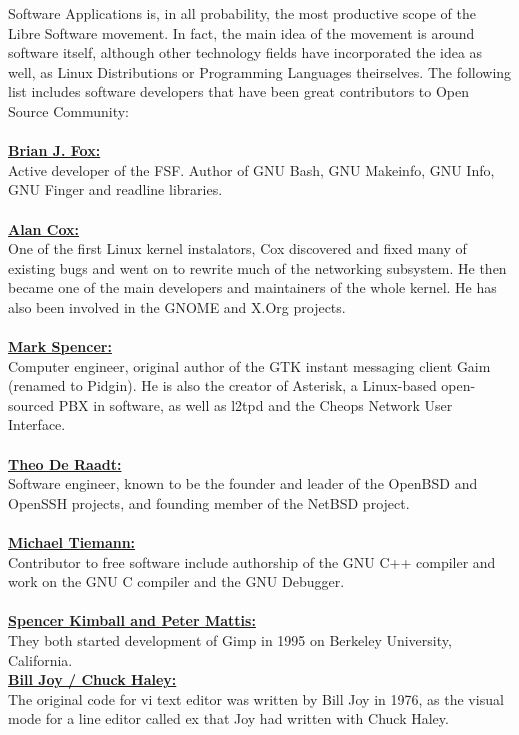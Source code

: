 \documentclass[10pt, a4paper, oneside]{report}
\begin{document}
Software Applications is, in all probability, the most productive scope of the Libre Software movement. In fact, the main idea of the movement is around software itself, although other technology fields have incorporated the idea as well, as Linux Distributions or Programming Languages theirselves.
The following list includes software developers that have been great contributors to Open Source Community:\\
\\
\textbf{\underline{Brian J. Fox:}}\\
Active developer of the FSF. Author of GNU Bash, GNU Makeinfo, GNU Info, GNU Finger and readline libraries.\\
\\
\textbf{\underline{Alan Cox:}}\\
One of the first Linux kernel instalators, Cox discovered and fixed many of existing bugs and went on to rewrite much of the networking subsystem. 
He then became one of the main developers and maintainers of the whole kernel.
He has also been involved in the GNOME and X.Org projects.\\
\\
\textbf{\underline{Mark Spencer:}}\\
Computer engineer, original author of the GTK instant messaging client Gaim (renamed to Pidgin).
He is also the creator of Asterisk, a Linux-based open-sourced PBX in software, as well as l2tpd and the Cheops Network User Interface.\\
\\
\textbf{\underline{Theo De Raadt:}}\\
Software engineer, known to be the founder and leader of the OpenBSD and OpenSSH projects, and founding member of the NetBSD project.\\
\\
\textbf{\underline{Michael Tiemann:}}\\
Contributor to free software include authorship of the GNU C++ compiler and work on the GNU C compiler and the GNU Debugger.\\
\\
\textbf{\underline{Spencer Kimball and Peter Mattis:}}\\
They both started development of Gimp in 1995 on Berkeley University, California.\\
\newpage
{\noindent}\textbf{\underline{Bill Joy / Chuck Haley:}}\\
The original code for vi text editor was written by Bill Joy in 1976, as the visual mode for a line editor called ex that Joy had written with Chuck Haley.\\ 
\end{document}
